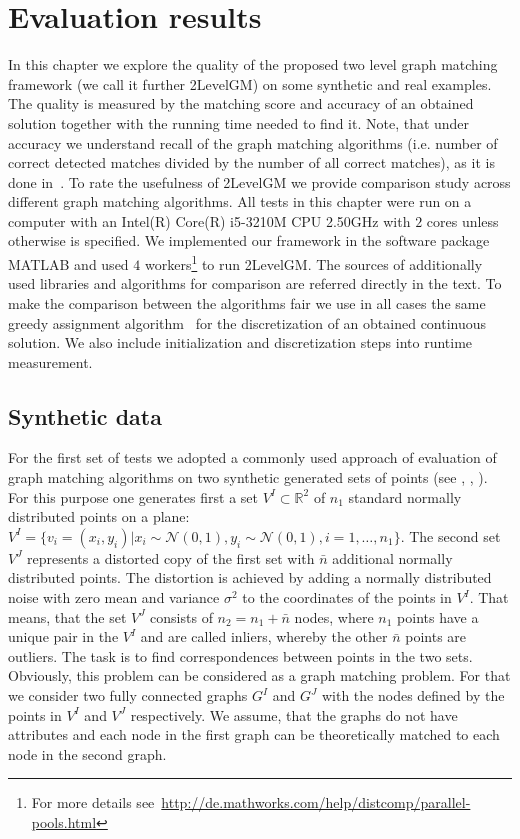 \chapter{Evaluation results} \label{chapter:results}

In this chapter we explore the quality of the proposed two level graph matching framework (we call it further 2LevelGM) on some synthetic and real examples. The quality is measured by the matching score and accuracy of an obtained solution together with the running time needed to find it. Note, that under accuracy we understand  recall of the graph matching algorithms (i.e. number of correct detected matches divided by the number of all correct matches), as it is done in~\cite{Cho2014_Haystack,Cho2010_RRWM,Cho2012_ProgressiveGM,Duchenne2011,Rangarajan1996_GAGM,Leordeanu2005_SM,Leordeanu2009_IPFP}.
To rate the usefulness of 2LevelGM we provide comparison study across different graph matching algorithms. All tests in this chapter were run on a computer with an Intel(R) Core(R) i5-3210M CPU 2.50GHz with $2$ cores unless otherwise is specified. We implemented our framework in the software package MATLAB and used $4$ workers\footnote{For more details see~\url{http://de.mathworks.com/help/distcomp/parallel-pools.html}} to run 2LevelGM. The sources of additionally used libraries and algorithms for comparison are referred directly in the text. To make the comparison between the algorithms fair we use in all cases the same greedy assignment algorithm~\cite{Leordeanu2005_SM} for the discretization of an obtained continuous solution. We also include initialization and discretization steps into runtime measurement.

\section{Synthetic data}
For the first set of tests we adopted a commonly used approach of evaluation of graph matching algorithms on two synthetic generated sets of points (see \cite{Cho2014_Haystack}, \cite{Cho2010_RRWM}, \cite{Leordeanu2009_IPFP}). 
For this purpose one generates first a set $V^I\subset\mathbb{R}^2$ of $n_1$ standard normally distributed points on a plane: $V^I=\{v_i=(x_i,y_i)|x_i\sim\mathcal{N}(0,1),y_i\sim\mathcal{N}(0,1),i=1,\dots,n_1\}$. The second set $V^J$ represents a distorted copy of the first set with $\bar{n}$ additional normally distributed points. The distortion is achieved by adding a normally distributed noise with zero mean and variance $\sigma^2$ to the coordinates of the points in $V^I$. That means, that the set $V^J$ consists of $n_2=n_1+\bar{n}$ nodes, where $n_1$ points have a unique pair in the $V^I$ and are called inliers, whereby the other $\bar{n}$ points are outliers. The task is to find correspondences between points in the two sets.
Obviously, this problem can be considered as a graph matching problem. For that we consider two fully connected graphs $G^I$ and $G^J$ with the nodes defined by the points in $V^I$ and $V^J$ respectively. We assume, that the graphs do not have attributes and each node in the first graph can be theoretically matched to each node in the second graph.


